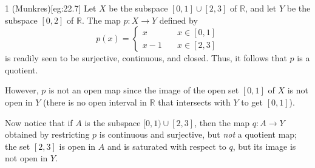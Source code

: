 \begin{egBox}{1 (Munkres)}[eg:22.7]
    Let \( X \) be the subspace \( [ 0, 1 ] \cup [ 2, 3 ] \) of 
    \( \mathbb{R} \), and let \( Y \) be the subspace \( [ 0, 2 ] \) of 
    \( \mathbb{R} \).
    The map \( p: X \rightarrow Y \) defined by
    \begin{equation*}
        p ( x )
        =
        \begin{cases} 
            x \quad & x \in [ 0, 1 ]
            \\ 
            x - 1 \quad & x \in [ 2, 3 ]
        \end{cases}
    \end{equation*}
    is readily seen to be surjective, continuous, and closed.
    Thus, it follows that \( p \) is a quotient.

    \baseSkip

    However, \( p \) is not an open map since the image of the open set
    \( [ 0, 1 ] \) of \( X \) is not open in \( Y \) (there is no open
    interval in \( \mathbb{R} \) that intersects with \( Y \) to get 
    \( [ 0, 1 ] \)).

    \baseSkip

    Now notice that if \( A \) is the subspace \( [ 0, 1 ) \cup [ 2, 3 ] \), 
    then the map \( q: A \rightarrow Y \) obtained by restricting \( p \) is 
    continuous and surjective, but \textit{not} a quotient map;
    the set \( [ 2, 3 ] \) is open in \( A \) and is saturated with respect to
    \( q \), but its image is not open in \( Y \).
\end{egBox}

